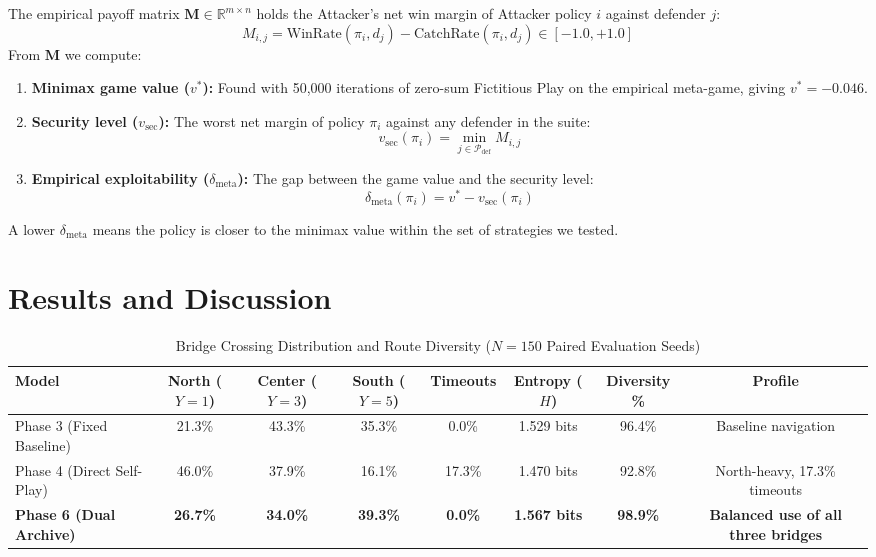 \documentclass[conference]{IEEEtran}
\begin{document}
The empirical payoff matrix $\bm{M} \in \mathbb{R}^{m \times n}$ holds the Attacker's net win margin of Attacker policy $i$ against defender $j$:
\begin{equation}
M_{i, j} = \text{WinRate}(\pi_i, d_j) - \text{CatchRate}(\pi_i, d_j) \in [-1.0, +1.0]
\end{equation}
From $\bm{M}$ we compute:
\begin{enumerate}
    \item \textbf{Minimax game value ($v^*$):} Found with 50,000 iterations of zero-sum Fictitious Play on the empirical meta-game, giving $v^* = -0.046$.
    \item \textbf{Security level ($v_{\text{sec}}$):} The worst net margin of policy $\pi_i$ against any defender in the suite:
    \begin{equation}
    v_{\text{sec}}(\pi_i) = \min_{j \in \mathcal{P}_{\text{def}}} M_{i, j}
    \end{equation}
    \item \textbf{Empirical exploitability ($\delta_{\text{meta}}$):} The gap between the game value and the security level:
    \begin{equation}
    \delta_{\text{meta}}(\pi_i) = v^* - v_{\text{sec}}(\pi_i)
    \end{equation}
\end{enumerate}
A lower $\delta_{\text{meta}}$ means the policy is closer to the minimax value within the set of strategies we tested.

\section{Results and Discussion}

\begin{table}[t]
\caption{Bridge Crossing Distribution and Route Diversity ($N=150$ Paired Evaluation Seeds)}
\label{tab:bridge_diversity}
\centering
\begin{tabular}{lccccccc}
\toprule
\textbf{Model} & \textbf{North ($Y=1$)} & \textbf{Center ($Y=3$)} & \textbf{South ($Y=5$)} & \textbf{Timeouts} & \textbf{Entropy ($H$)} & \textbf{Diversity \%} & \textbf{Profile} \\
\midrule
Phase 3 (Fixed Baseline)        & 21.3\% & 43.3\% & 35.3\% & 0.0\%  & 1.529 bits & 96.4\% & Baseline navigation \\
Phase 4 (Direct Self-Play)      & 46.0\% & 37.9\% & 16.1\% & 17.3\% & 1.470 bits & 92.8\% & North-heavy, 17.3\% timeouts \\
\textbf{Phase 6 (Dual Archive)} & \textbf{26.7\%} & \textbf{34.0\%} & \textbf{39.3\%} & \textbf{0.0\%}  & \textbf{1.567 bits} & \textbf{98.9\%} & \textbf{Balanced use of all three bridges} \\
\bottomrule
\end{tabular}
\end{table}
\end{document}
